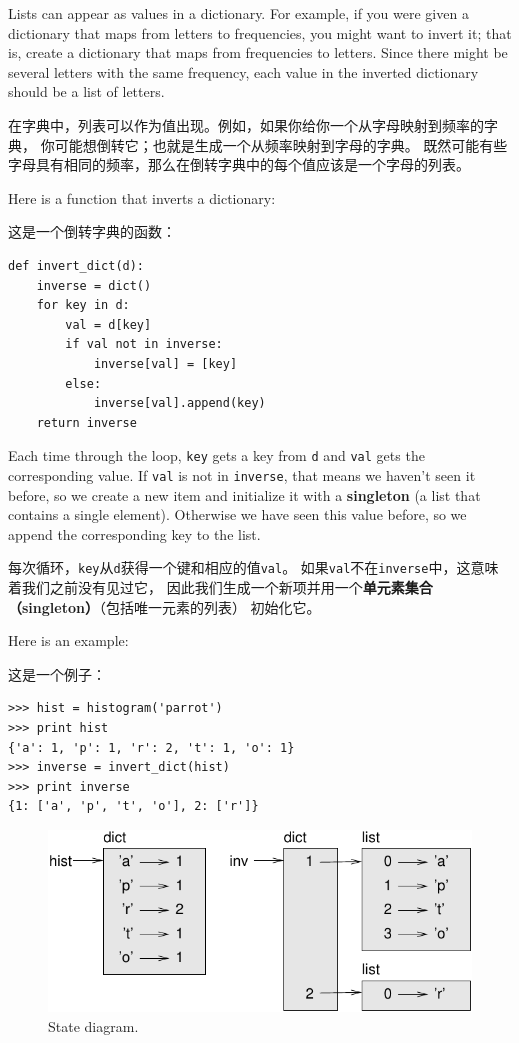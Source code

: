 \documentclass[10pt]{book}
\begin{document}
\begin{CJK}{UTF8}{gbsn}
Lists can appear as values in a dictionary.  For example, if you
were given a dictionary that maps from letters to frequencies, you
might want to invert it; that is, create a dictionary that maps
from frequencies to letters.  Since there might be several letters
with the same frequency, each value in the inverted dictionary
should be a list of letters.

在字典中，列表可以作为值出现。例如，如果你给你一个从字母映射到频率的字典，
你可能想倒转它；也就是生成一个从频率映射到字母的字典。
既然可能有些字母具有相同的频率，那么在倒转字典中的每个值应该是一个字母的列表。

Here is a function that inverts a dictionary:

这是一个倒转字典的函数：

\begin{verbatim}
def invert_dict(d):
    inverse = dict()
    for key in d:
        val = d[key]
        if val not in inverse:
            inverse[val] = [key]
        else:
            inverse[val].append(key)
    return inverse
\end{verbatim}
%
Each time through the loop, {\tt key} gets a key from {\tt d} and 
{\tt val} gets the corresponding value.  If {\tt val} is not in {\tt inverse},
that means we haven't seen it before, so we create a new item and
initialize it with a {\bf singleton} (a list that contains a
single element).  Otherwise we have seen this value before, so we
append the corresponding key to the list.

每次循环，{\tt key}从{\tt d}获得一个键和相应的值{\tt val}。
如果{\tt val}不在{\tt inverse}中，这意味着我们之前没有见过它，
因此我们生成一个新项并用一个{\bf 单元素集合（singleton）}（包括唯一元素的列表）
初始化它。

Here is an example:

这是一个例子：

\begin{verbatim}
>>> hist = histogram('parrot')
>>> print hist
{'a': 1, 'p': 1, 'r': 2, 't': 1, 'o': 1}
>>> inverse = invert_dict(hist)
>>> print inverse
{1: ['a', 'p', 't', 'o'], 2: ['r']}
\end{verbatim}

\begin{figure}
\centerline
{\includegraphics[scale=0.8]{figs/dict1.pdf}}
\caption{State diagram.}
\label{fig.dict1}
\end{figure}


\end{CJK}
\end{document}
